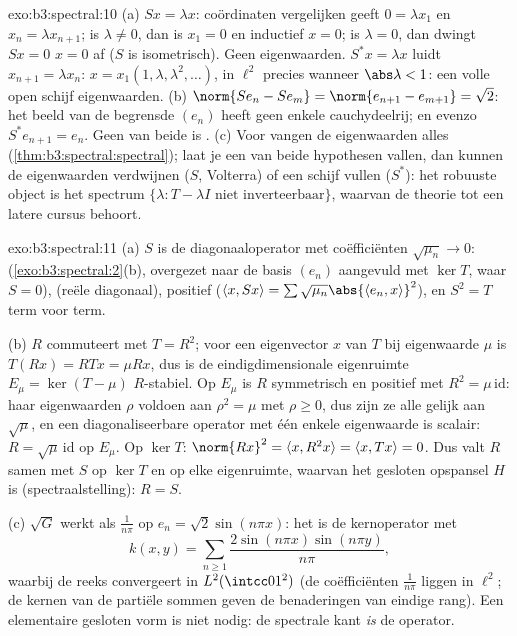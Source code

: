 \begin{solution}{exo:b3:spectral:10}
(a) $Sx = \lambda x$: coördinaten vergelijken geeft $0 = \lambda
x_1$ en $x_n = \lambda x_{n+1}$; is $\lambda \ne 0$, dan is $x_1
= 0$ en inductief $x = 0$; is $\lambda = 0$, dan dwingt $Sx = 0$
$x = 0$ af ($S$ is isometrisch). Geen eigenwaarden. $S^*x =
\lambda x$ luidt $x_{n+1} = \lambda x_n$: $x = x_1(1, \lambda,
\lambda^2, \dots)$, in $\ell^2$ precies wanneer $\abs\lambda <
1$: een volle open schijf eigenwaarden.
(b) $\norm{Se_n - Se_m} = \norm{e_{n+1} - e_{m+1}} = \sqrt2$: het
beeld van de begrensde $(e_n)$ heeft geen enkele cauchydeelrij;
en evenzo $S^*e_{n+1} = e_n$. Geen van beide is .
(c) Voor   vangen de
eigenwaarden alles (\cref{thm:b3:spectral:spectral}); laat je een
van beide hypothesen vallen, dan kunnen de eigenwaarden 
verdwijnen ($S$, Volterra) of een schijf vullen ($S^*$): het
robuuste object is het spectrum $\{\lambda : T - \lambda I
\text{ niet inverteerbaar}\}$, waarvan de theorie tot een latere
cursus behoort.
\end{solution}

\begin{solution}{exo:b3:spectral:11}
(a) $S$ is de diagonaaloperator met coëfficiënten $\sqrt{\mu_n}
\to 0$:  (\cref{exo:b3:spectral:2}(b), overgezet naar de
basis $(e_n)$ aangevuld met $\ker T$, waar $S = 0$),
 (reële diagonaal), positief ($\langle x, Sx\rangle
= \sum\sqrt{\mu_n}\abs{\langle e_n, x\rangle}^2$), en $S^2 = T$
term voor term.

(b) $R$ commuteert met $T = R^2$; voor een eigenvector $x$ van
$T$ bij eigenwaarde $\mu$ is $T(Rx) = RTx = \mu Rx$, dus is de
eindigdimensionale eigenruimte $E_\mu = \ker(T - \mu)$
$R$-stabiel. Op $E_\mu$ is $R$ symmetrisch en positief met $R^2 =
\mu\,\mathrm{id}$: haar eigenwaarden $\rho$ voldoen aan $\rho^2 =
\mu$ met $\rho \geq 0$, dus zijn ze alle gelijk aan $\sqrt\mu$,
en een diagonaliseerbare operator met één enkele eigenwaarde is
scalair: $R = \sqrt\mu\,\mathrm{id}$ op $E_\mu$. Op $\ker T$:
$\norm {Rx}^2 = \langle x, R^2x\rangle = \langle x, Tx\rangle =
0$. Dus valt $R$ samen met $S$ op $\ker T$ en op elke eigenruimte,
waarvan het gesloten opspansel $H$ is (spectraalstelling): $R =
S$.

(c) $\sqrt G$ werkt als $\frac1{n\pi}$ op $e_n =
\sqrt2\sin(n\pi x)$: het is de kernoperator met
\[
k(x, y) = \sum_{n\geq1}\frac{2\sin(n\pi x)\sin(n\pi
y)}{n\pi},
\]
waarbij de reeks convergeert in $L^2(\intcc01^2)$ (de
coëfficiënten $\frac1{n\pi}$ liggen in $\ell^2$; de kernen van de
partiële sommen geven de benaderingen van eindige rang). Een
elementaire gesloten vorm is niet nodig: de spectrale kant
\emph{is} de operator.
\end{solution}

